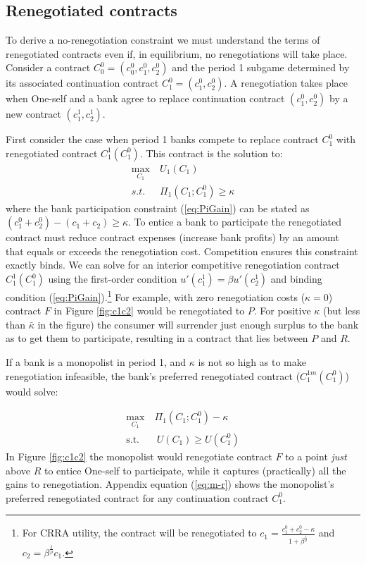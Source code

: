 \documentclass[11pt,english]{article}
\theoremstyle{plain}
\theoremstyle{definition}
\begin{document}
\subsection{Renegotiated contracts}

To derive a no-renegotiation constraint we must understand the
terms of renegotiated contracts even if, in equilibrium, no renegotiations
will take place. Consider a contract $C_{0}^{0}=(c_{0}^{0},c_{1}^{0},c_{2}^{0})$
and the period 1 subgame determined by its associated continuation
contract $C_{1}^{0}=(c_{1}^{0},c_{2}^{0})$. A renegotiation takes
place when One-self and a bank agree to replace continuation contract
$(c_{1}^{0},c_{2}^{0})$ by a new contract $\left(c_{1}^{1},c_{2}^{1}\right)$.


First consider the case when period 1 banks compete to replace contract
$C_{1}^{0}$ with renegotiated contract $C_{1}^{1}(C_{1}^{0})$. This contract is the solution to: 
\begin{align}
\max_{C_{1}} & \ U_{1}(C_{1})\\
s.t. & \ \Pi_{1}(C_{1};C_{1}^{0})\ge\kappa\label{eq:PiGain}
\end{align}
{}where the bank participation constraint (\ref{eq:PiGain}) can be stated
as $(c_{1}^{0}+c_{2}^{0})-(c_{1}+c_{2})\ge\kappa$. To entice a bank
to participate the renegotiated contract must reduce contract expenses (increase bank profits) by an amount that equals or exceeds the
renegotiation cost. Competition ensures this constraint exactly
binds. We can solve for an
interior competitive renegotiation contract $C_{1}^{1}(C_{1}^{0})$ using the first-order condition $u'(c_{1}^{1})=\beta u'(c_{2}^{1})$
and binding condition (\ref{eq:PiGain}).\footnote{ For CRRA utility, the contract will be renegotiated to $c_{1}=\frac{c_{1}^{0}+c_{2}^{0}-\kappa}{1+\beta^{\frac{1}{\rho}}}$
and $c_{2}=\beta^{\frac{1}{\rho}}c_{1}$. } For example, with zero renegotiation costs ($\kappa=0$) contract
$F$ in Figure \ref{fig:c1c2} would be renegotiated to $P$. For
positive $\kappa$ (but less than $\bar{\kappa}$ in the figure) the
consumer will surrender just enough surplus to the bank as to get
them to participate, resulting in a contract that lies between $P$
and $R$.

If a bank is a monopolist in period 1, and $\kappa$ is not so high
as to make renegotiation infeasible, the bank's preferred renegotiated contract ($C_{1}^{1m}(C_{1}^{0})$) would solve:

\begin{align}
\max_{C_{1}}\ & \Pi_{1}(C_{1};C_{1}^{0})-\kappa\\
\text{s.t.} & \ U(C_{1})\geq U(C_{1}^{0})\label{eq:ugain}
\end{align}
In Figure \ref{fig:c1c2} the monopolist would renegotiate contract
$F$ to a point \textit{just} above $R$ to entice One-self
to participate, while it captures (practically) all the gains to renegotiation. Appendix equation (\ref{eq:m-r}) shows the monopolist's
preferred renegotiated contract for any continuation contract
$C_{1}^{0}$.
\end{document}
